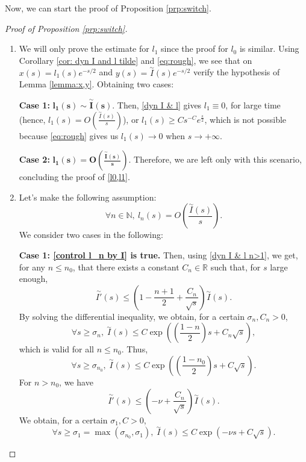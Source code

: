 \documentclass[11pt,a4paper]{article}
\newcommand{\1}{\mathbbm{1}}
\numberwithin{equation}{section}
\newcommand{\numberset}{\mathbb}
\newcommand{\N}{\numberset{N}}
\newcommand{\R}{\numberset{R}}
\theoremstyle{remark}
\begin{document}
Now, we can start the proof of Proposition \ref{prp:switch}.
\begin{proof}[Proof of Proposition \ref{prp:switch}]

\begin{enumerate}[label=(\roman*)]
\item We will only prove the estimate for $l_1$ since the proof for $l_0$ is  similar. Using Corollary \ref{cor: dyn I and l tilde} and \eqref{eq:rough}, we see that on $x(s)=l_1(s)e^{-s/2}$ and $y(s)=\overset{\sim}{I}(s)e^{-s/2}$ verify the hypothesis of Lemma \ref{lemma:x,y}. Obtaining two cases:

\textbf{Case 1:} $\bm{l_1(s)\sim}\overset{\sim}{\bm{I}}\bm{(s).}$ Then, \eqref{dyn I & l} gives $l_1\equiv0$, for large time (hence, $l_1(s)=O\left(\frac{\overset{\sim}{I}(s)}{s}\right)$), or $l_1(s)\geq Cs^{-C}e^{\frac{s}{2}}$, which is not possible because \eqref{eq:rough} gives us $l_1(s)\rightarrow 0$ when $s\rightarrow +\infty$.

\textbf{Case 2:} $\bm{l_1(s)=O\left(\frac{\overset{\sim}{I}(s)}{s}\right).}$ Therefore, we are left only with this scenario, concluding the proof of \ref{l0,l1}.
\item Let's make the following assumption:
\begin{equation}\label{control l_n by I}
\forall n\in \N,\ l_n(s)=O\left(\frac{\overset{\sim}{I}(s)}{s}\right).
\end{equation}
We consider two cases in the following:

\textbf{Case 1: \eqref{control l_n by I} is true.} Then, using \eqref{dyn I & l n>1}, we get, for any $n\leq n_0$, that there exists a constant $C_n\in \R$ such that, for $s$ large enough,
$$\overset{\sim}{I'}(s)\leq \left(1-\frac{n+1}{2}+\frac{C_n}{\sqrt{s}}\right)\overset{\sim}{I}(s).$$
By solving the differential inequality, we obtain, for a certain $\sigma_n,C_n>0$,
\begin{equation*}
\forall s\geq \sigma_n,\ \overset{\sim}{I}(s)\leq C \exp\left(\left(\frac{1-n}{2}\right)s+C_n\sqrt{s}\right),
\end{equation*}
which is valid for all $n\leq n_0$. Thus,
\begin{equation}\label{inequality n_0}
\forall s\geq \sigma_{n_0},\ \overset{\sim}{I}(s)\leq C \exp\left(\left(\frac{1-n_0}{2}\right)s+C\sqrt{s}\right).
\end{equation}
For $n>n_0$, we have
$$\overset{\sim}{I'}(s)\leq \left(-\nu+\frac{C_n}{\sqrt{s}}\right)\overset{\sim}{I}(s).$$
We obtain, for a certain $\sigma_1,C>0$,
\begin{equation*}
\forall s\geq \sigma_1=\max(\sigma_{n_0},\sigma_1),\ \overset{\sim}{I}(s)\leq C \exp(-\nu s+C\sqrt{s}).
\end{equation*}


\end{enumerate}
\end{proof}
\end{document}
